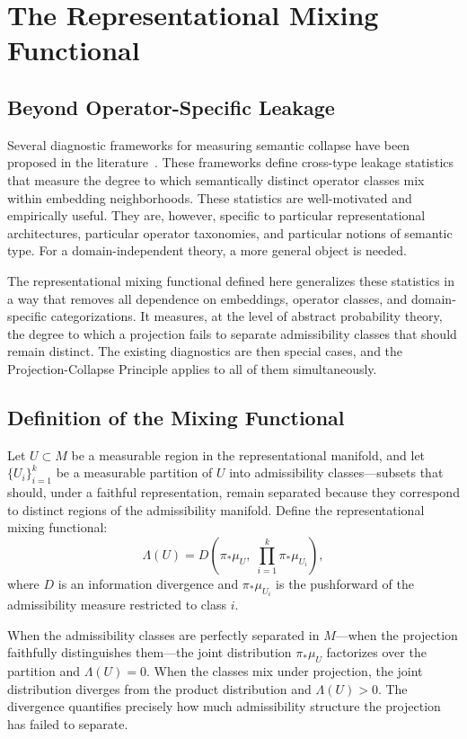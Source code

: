 \documentclass[12pt, oneside]{book}
\theoremstyle{plain-flyxion}
\theoremstyle{definition-flyxion}
\newcommand{\Lam}{\Lambda}
\begin{document}
\chapter{The Representational Mixing Functional}

\section{Beyond Operator-Specific Leakage}

Several diagnostic frameworks for measuring semantic collapse have been proposed in the
literature~\cite{denham2025}. These frameworks define cross-type leakage statistics that
measure the degree to which semantically distinct operator classes mix within embedding
neighborhoods. These statistics are well-motivated and empirically useful. They are,
however, specific to particular representational architectures, particular operator
taxonomies, and particular notions of semantic type. For a domain-independent theory, a
more general object is needed.

The representational mixing functional defined here generalizes these statistics in a way
that removes all dependence on embeddings, operator classes, and domain-specific
categorizations. It measures, at the level of abstract probability theory, the degree to
which a projection fails to separate admissibility classes that should remain distinct. The
existing diagnostics are then special cases, and the Projection-Collapse Principle applies
to all of them simultaneously.

\section{Definition of the Mixing Functional}

Let $U\subset M$ be a measurable region in the representational manifold, and let
$\{U_i\}_{i=1}^k$ be a measurable partition of $U$ into admissibility classes---subsets
that should, under a faithful representation, remain separated because they correspond to
distinct regions of the admissibility manifold. Define the representational mixing
functional:
\begin{equation}\label{eq:lambda}
\Lam(U) = D\!\left(\pi_*\mu_U,\; \prod_{i=1}^k \pi_*\mu_{U_i}\right),
\end{equation}
where $D$ is an information divergence and $\pi_*\mu_{U_i}$ is the pushforward of the
admissibility measure restricted to class $i$.

When the admissibility classes are perfectly separated in $M$---when the projection
faithfully distinguishes them---the joint distribution $\pi_*\mu_U$ factorizes over the
partition and $\Lam(U) = 0$. When the classes mix under projection, the joint distribution
diverges from the product distribution and $\Lam(U)>0$. The divergence quantifies
precisely how much admissibility structure the projection has failed to separate.
\end{document}
